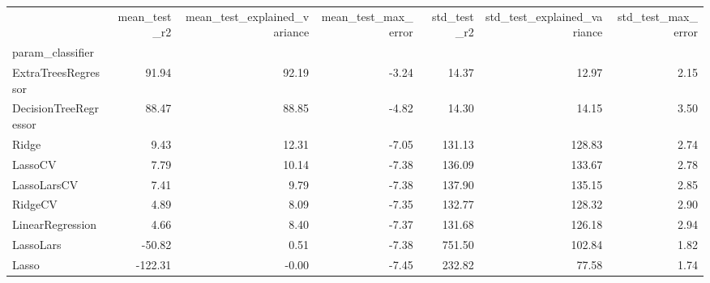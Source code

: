 \begin{tabular}{lrrrrrr}
\toprule
 & mean_test_r2 & mean_test_explained_variance & mean_test_max_error & std_test_r2 & std_test_explained_variance & std_test_max_error \\
param_classifier &  &  &  &  &  &  \\
\midrule
ExtraTreesRegressor & 91.94 & 92.19 & -3.24 & 14.37 & 12.97 & 2.15 \\
DecisionTreeRegressor & 88.47 & 88.85 & -4.82 & 14.30 & 14.15 & 3.50 \\
Ridge & 9.43 & 12.31 & -7.05 & 131.13 & 128.83 & 2.74 \\
LassoCV & 7.79 & 10.14 & -7.38 & 136.09 & 133.67 & 2.78 \\
LassoLarsCV & 7.41 & 9.79 & -7.38 & 137.90 & 135.15 & 2.85 \\
RidgeCV & 4.89 & 8.09 & -7.35 & 132.77 & 128.32 & 2.90 \\
LinearRegression & 4.66 & 8.40 & -7.37 & 131.68 & 126.18 & 2.94 \\
LassoLars & -50.82 & 0.51 & -7.38 & 751.50 & 102.84 & 1.82 \\
Lasso & -122.31 & -0.00 & -7.45 & 232.82 & 77.58 & 1.74 \\
\bottomrule
\end{tabular}
